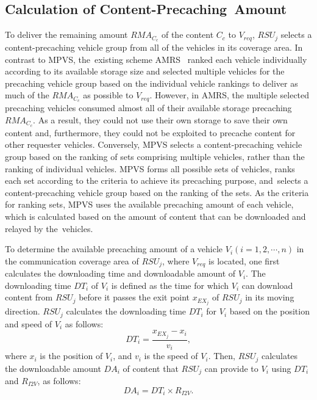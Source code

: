 \documentclass[sensors,aricle,accept,pdftex,moreauthors]{Definitions/mdpi}
\begin{document}
\subsection{Calculation of Content-Precaching~Amount} \label{sec4.2}
To deliver the remaining amount $RMA_{C_{c}}$ of the content $C_{c}$ to $V_{req}$, $RSU_{j}$ selects a content-precaching vehicle group from all of the vehicles in its coverage area. 
In contrast to MPVS, the~existing scheme AMRS~\cite{Ahmed2018} ranked each vehicle individually according to its available storage size and selected multiple vehicles for the precaching vehicle group based on the individual vehicle rankings to deliver as much of the $RMA_{C_{c}}$ as possible to $V_{req}$. 
However, in AMRS, the multiple selected precaching vehicles consumed almost all of their available storage precaching $RMA_{C_{c}}$.
As a result, they could not use their own storage to save their own content and, furthermore, they could not be exploited to precache content for other requester vehicles.
Conversely, MPVS selects a content-precaching vehicle group based on the ranking of sets comprising multiple vehicles, rather than the ranking of individual vehicles.
MPVS forms all possible sets of vehicles, ranks each set according to the criteria to achieve its precaching purpose, and~selects a content-precaching vehicle group based on the ranking of the sets.
As the criteria for ranking sets, MPVS uses the available precaching amount of each vehicle, which is calculated based on the amount of content that can be downloaded and relayed by the~vehicles. 

To determine the available precaching amount of a vehicle $V_{i} (i=1,2,\cdots,n)$ in the communication coverage area of $RSU_{j}$, where $V_{req}$ is located, one first calculates the downloading time and downloadable amount of $V_{i}$.
The downloading time $DT_{i}$ of $V_{i}$ is defined as the time for which $V_{i}$ can download content from $RSU_{j}$ before it passes the exit point $x_{EX_{j}}$ of $RSU_{j}$ in its moving direction.
$RSU_{j}$ calculates the downloading time $DT_{i}$ for $V_{i}$ based on the position and speed of $V_{i}$ as follows:
\begin{equation}
    DT_{i}=\frac{x_{EX_{j}}-x_{i}}{v_{i}},
\end{equation}
where $x_{i}$ is the position of $V_{i}$, and $v_{i}$ is the speed of $V_{i}$.
Then, $RSU_{j}$ calculates the downloadable amount $DA_{i}$ of content that $RSU_{j}$ can provide to $V_{i}$ using $DT_{i}$ and $R_{I2V}$, as follows:
\begin{equation}
    DA_{i}=DT_{i} \times R_{I2V}.
\end{equation}
\end{document}
